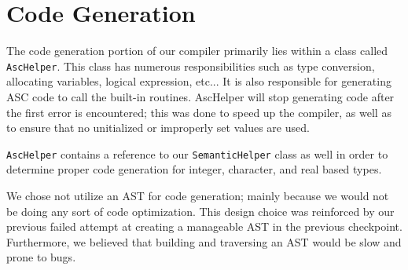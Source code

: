 \documentclass{article}
\begin{document}
\section*{Code Generation}
\begin{description}

\item
	The code generation portion of our compiler primarily lies within a class called \texttt{AscHelper}. This class has numerous
	responsibilities such as type conversion, allocating variables, logical expression, etc... It is also responsible for generating
	ASC code to call the built-in routines. AscHelper will stop generating code after the first error is encountered; this was done to
	speed up the compiler, as well as to ensure that no unitialized or improperly set values are used.
	
	\texttt{AscHelper} contains a reference to our \texttt{SemanticHelper} class as well in order to determine proper code generation for
	integer, character, and real based types.
	
	We chose not utilize an AST for code generation; mainly because we would not be doing any sort of code optimization. This design choice
	was reinforced by our previous failed attempt at creating a manageable AST in the previous checkpoint. Furthermore, we believed that building
	and traversing an AST would be slow and prone to bugs.


\end{description}
\end{document}
